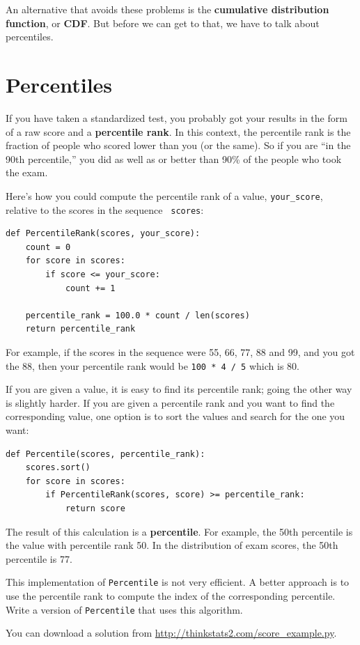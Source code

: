 \documentclass[12pt]{book}
\begin{document}
An alternative that avoids these problems is the {\bf cumulative
distribution function}, or {\bf CDF}.  But before we can get to that,
we have to talk about percentiles.


\section{Percentiles}

If you have taken a standardized test, you probably got your
results in the form of a raw score and a {\bf percentile rank}.
In this context, the percentile rank is the fraction of people who
scored lower than you (or the same).  So if you are ``in the 90th
percentile,'' you did as well as or better than 90\% of the people who
took the exam.

Here's how you could compute the percentile rank of a value,
\verb"your_score", relative to the scores in the sequence {\tt
  scores}:
%
\begin{verbatim}
def PercentileRank(scores, your_score):
    count = 0
    for score in scores:
        if score <= your_score:
            count += 1

    percentile_rank = 100.0 * count / len(scores)
    return percentile_rank
\end{verbatim}
%
%
For example, if the scores in the sequence were 55, 66, 77, 88 and 99,
and you got the 88, then your percentile rank would be {\tt 100 * 4 / 5}
which is 80.

If you are given a value, it is easy to find its percentile rank; going
the other way is slightly harder.  If you are given a percentile rank
and you want to find the corresponding value, one option is to
sort the values and search for the one you want:
%
\begin{verbatim}
def Percentile(scores, percentile_rank):
    scores.sort()
    for score in scores:
        if PercentileRank(scores, score) >= percentile_rank:
            return score
\end{verbatim}

The result of this calculation is a {\bf percentile}.  For example,
the 50th percentile is the value with percentile rank 50.  In the
distribution of exam scores, the 50th percentile is 77.

\begin{exercise}
This implementation of {\tt Percentile} is not very efficient.  A
better approach is to use the percentile rank to compute the index of
the corresponding percentile.  Write a version of {\tt Percentile} that
uses this algorithm.

You can download a solution from \url{http://thinkstats2.com/score_example.py}.

\end{exercise}
\end{document}
